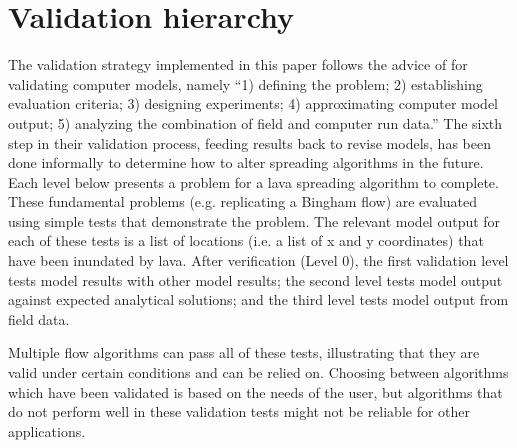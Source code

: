 
	\section{Validation hierarchy}\label{sec_validationb}
	
	The validation strategy implemented in this paper follows the advice of \citet{bayarri2007framework} for validating computer models, namely ``1) defining the problem; 2) establishing evaluation criteria; 3) designing experiments; 4) approximating computer model output; 5) analyzing the combination of field and computer run data.'' The sixth step in their validation process, feeding results back to revise models, has been done informally to determine how to alter spreading algorithms in the future. Each level below presents a problem for a lava spreading algorithm to complete. These fundamental problems (e.g. replicating a Bingham flow) are evaluated using simple tests that demonstrate the problem. The relevant model output for each of these tests is a list of locations (i.e. a list of x and y coordinates) that have been inundated by lava. After verification (Level 0), the first validation level tests model results with other model results; the second level tests model output against expected analytical solutions; and the third level tests model output from field data. 
	
	Multiple flow algorithms can pass all of these tests, illustrating that they are valid under certain conditions and can be relied on. Choosing between algorithms which have been validated is based on the needs of the user, but algorithms that do not perform well in these validation tests might not be reliable for other applications.

